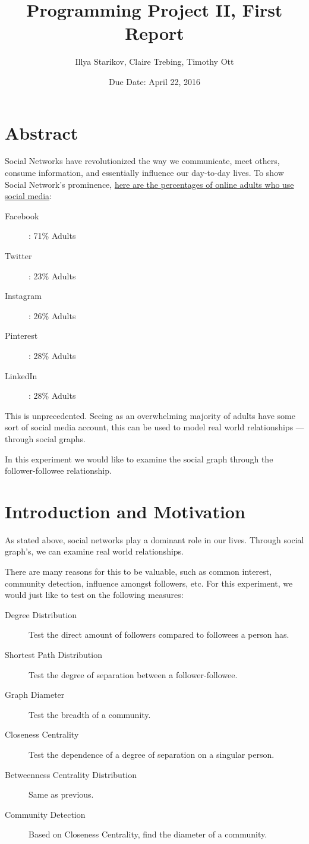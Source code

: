 \documentclass{article}
\title{Programming Project II, First Report}
\author{Illya Starikov, Claire Trebing, Timothy Ott}
\date{Due Date: April 22, 2016}
\begin{document}
\maketitle

\section{Abstract}
Social Networks have revolutionized the way we communicate, meet others, consume information, and essentially influence our day-to-day lives. To show Social Network's prominence, \href{http://www.pewinternet.org/fact-sheets/social-networking-fact-sheet/}{here are the percentages of online adults who use social media}:

\begin{description}
    \item [Facebook]: 71\% Adults
    \item [Twitter]: 23\% Adults
    \item [Instagram]: 26\% Adults
    \item [Pinterest]: 28\% Adults
    \item [LinkedIn]: 28\% Adults
\end{description}

This is unprecedented. Seeing as an overwhelming majority of adults have some sort of social media account, this can be used to model real world relationships --- through social graphs.

In this experiment we would like to examine the social graph through the follower-followee relationship.

\section{Introduction and Motivation}
As stated above, social networks play a dominant role in our lives. Through social graph's, we can examine real world relationships.

There are many reasons for this to be valuable, such as common interest, community detection, influence amongst followers, etc. For this experiment, we would just like to test on the following measures:

\begin{description}
    \item [Degree Distribution] Test the direct amount of followers compared to followees a person has.
    \item [Shortest Path Distribution] Test the degree of separation between a follower-followee.
    \item [Graph Diameter] Test the breadth of a community.
    \item [Closeness Centrality] Test the dependence of a degree of separation on a singular person.
    \item [Betweenness Centrality Distribution] Same as previous.
    \item [Community Detection] Based on Closeness Centrality, find the diameter of a community.
\end{description}
\end{document}
